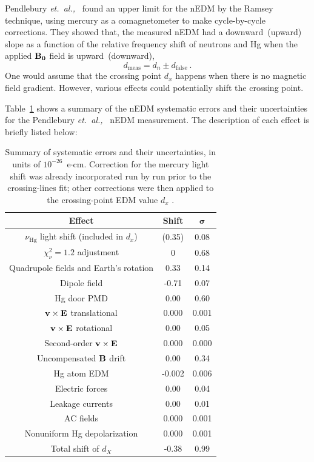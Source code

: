 Pendlebury {\it{et.~al.,}}~\cite{Pendlebury2015} found an upper limit
for the nEDM by the Ramsey technique, using mercury as a
comagnetometer to make cycle-by-cycle corrections.  They showed that, the
measured nEDM had a downward~(upward) slope as a function of the
relative frequency shift of neutrons and Hg when the applied
$\bf{B_0}$ field is upward~(downward),
\begin{equation}
  d_{\mathrm {meas}}= d_n \pm d_{\mathrm{false}}~.
\end{equation}
One would assume that the crossing point $d_x$ happens when there is
no magnetic field gradient. However, various effects could potentially
shift the crossing point.


Table~\ref{tab:nedmsystematics} shows a summary of the nEDM systematic
errors and their uncertainties for the Pendlebury
{\it{et.~al.,}}~\cite{Pendlebury2015} nEDM measurement. The
description of each effect is briefly listed below:

\begin{table}[h!]
  \begin{center}
    \begin{tabular}{|c||c|c|}
      \hline
      \bf{Effect} & \bf{Shift} & $\boldsymbol{\sigma}$ \\ \hline \hline
      $\nu_{\mathrm{Hg}}$ light shift (included in $d_x$) & (0.35) & 0.08 \\ \hline
      $\chi_{\nu}^2 = 1.2$ adjustment & 0 & 0.68 \\ \hline
      Quadrupole fields and Earth's rotation & 0.33 & 0.14 \\ \hline
      Dipole field & -0.71 & 0.07 \\ \hline
      Hg door PMD & 0.00 & 0.60 \\ \hline
      $\bf{v} \times \bf{E}$ translational & 0.000 & 0.001 \\\hline
      $\bf{v} \times \bf{E}$ rotational & 0.00 & 0.05 \\ \hline
      Second-order $\bf{v} \times \bf{E}$ & 0.000 & 0.000 \\ \hline
      Uncompensated $\bf{B}$ drift & 0.00 & 0.34 \\ \hline
      Hg atom EDM & -0.002 & 0.006 \\ \hline
      Electric forces & 0.00 & 0.04 \\ \hline
      Leakage currents & 0.00 & 0.01 \\ \hline
      AC fields & 0.000 & 0.001 \\ \hline
      Nonuniform Hg depolarization & 0.000 & 0.001 \\ \hline
      Total shift of $d_X$ & -0.38 & 0.99 \\ \hline
    \end{tabular}
  \end{center}
  \caption[Summary of systematic errors for the most recent nEDM
  measurement]{\cite{Pendlebury2015}Summary of systematic errors and
    their uncertainties, in units of $10^{-26}$~e$\cdot$cm. Correction
    for the mercury light shift was already incorporated run by run
    prior to the crossing-lines fit; other corrections were then
    applied to the crossing-point EDM value $d_x$ .}
  \label{tab:nedmsystematics}
\end{table}

